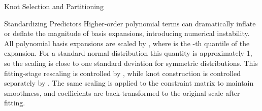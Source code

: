 \begin{Section}{Knot Selection and Partitioning}
%
\begin{SubSection}{Standardizing Predictors}
Higher-order polynomial terms can dramatically inflate or deflate the
magnitude of basis expansions, introducing numerical instability. All
polynomial basis expansions are scaled by
, where  is the \eqn{\zeta}{}-th
quantile of the expansion. For a standard normal distribution this quantity
is approximately 1, so the scaling is close to one standard deviation for
symmetric distributions. This fitting-stage rescaling is controlled by
, while knot construction is
controlled separately by . The same
scaling is applied to the constraint matrix to maintain smoothness, and
coefficients are back-transformed to the original scale after fitting.
\end{SubSection}

\end{Section}
%
